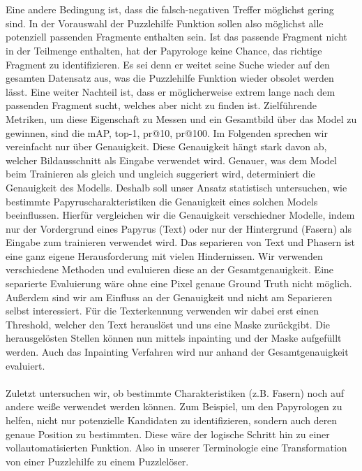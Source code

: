 \documentclass[12pt,a4paper]{article}
\begin{document}
\\\\
Eine andere Bedingung ist, dass die falsch-negativen Treffer möglichst gering sind. In der Vorauswahl der Puzzlehilfe Funktion sollen also möglichst alle potenziell passenden Fragmente enthalten sein. Ist das passende Fragment nicht in der Teilmenge enthalten, hat der Papyrologe keine Chance, das richtige Fragment zu identifizieren. Es sei denn er weitet seine Suche wieder auf den gesamten Datensatz aus, was die Puzzlehilfe Funktion wieder obsolet werden lässt. Eine weiter Nachteil ist, dass er möglicherweise extrem lange nach dem passenden Fragment sucht, welches aber nicht zu finden ist. 
Zielführende Metriken, um diese Eigenschaft zu Messen und ein Gesamtbild über das Model zu gewinnen, sind die mAP, top-1, pr@10, pr@100. Im Folgenden sprechen wir vereinfacht nur über Genauigkeit. Diese Genauigkeit hängt stark davon ab, welcher Bildausschnitt als Eingabe verwendet wird. Genauer, was dem Model beim Trainieren als gleich und ungleich suggeriert wird, determiniert die Genauigkeit des Modells. 
Deshalb soll unser Ansatz statistisch untersuchen, wie bestimmte Papyruscharakteristiken die Genauigkeit eines solchen Models beeinflussen. Hierfür vergleichen wir die Genauigkeit verschiedner Modelle, indem nur der Vordergrund eines Papyrus (Text) oder nur der Hintergrund (Fasern) als Eingabe zum trainieren verwendet wird. Das separieren von Text und Phasern ist eine ganz eigene Herausforderung mit vielen Hindernissen. Wir verwenden verschiedene Methoden und evaluieren diese an der Gesamtgenauigkeit. Eine separierte Evaluierung wäre ohne eine Pixel genaue Ground Truth nicht möglich. Außerdem sind wir am Einfluss an der Genauigkeit und nicht am Separieren selbst interessiert. Für die Texterkennung verwenden wir dabei erst einen Threshold, welcher den Text herauslöst und uns eine Maske zurückgibt. Die herausgelösten Stellen können nun mittels inpainting und der Maske aufgefüllt werden. Auch das Inpainting Verfahren wird nur anhand der Gesamtgenauigkeit evaluiert.
\\\\
Zuletzt untersuchen wir, ob bestimmte Charakteristiken (z.B. Fasern) noch auf andere weiße verwendet  werden können. Zum Beispiel, um den Papyrologen zu helfen, nicht nur potenzielle Kandidaten zu identifizieren, sondern auch deren genaue Position zu bestimmten. Diese wäre der logische Schritt hin zu einer vollautomatisierten Funktion. Also in unserer Terminologie eine Transformation von einer Puzzlehilfe zu einem Puzzlelöser.   
\end{document}

